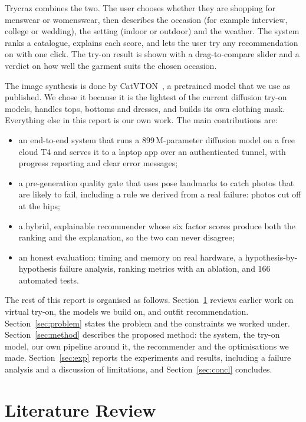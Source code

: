 \documentclass{article}
\begin{document}
Trycraz combines the two. The user chooses whether they are shopping for menswear or womenswear, then
describes the occasion (for example interview, college or wedding), the setting (indoor or outdoor) and
the weather. The system ranks a catalogue, explains each score, and lets the user try any
recommendation on with one click. The try-on result is shown with a drag-to-compare slider and a
verdict on how well the garment suits the chosen occasion.

The image synthesis is done by CatVTON~\cite{catvton}, a pretrained model that we use as published.
We chose it because it is the lightest of the current diffusion try-on models, handles tops, bottoms
and dresses, and builds its own clothing mask. Everything else in this report is our own work. The
main contributions are:
\begin{itemize}
\item an end-to-end system that runs a 899\,M-parameter diffusion model on a free cloud T4 and serves
it to a laptop app over an authenticated tunnel, with progress reporting and clear error messages;
\item a pre-generation quality gate that uses pose landmarks to catch photos that are likely to fail,
including a rule we derived from a real failure: photos cut off at the hips;
\item a hybrid, explainable recommender whose six factor scores produce both the ranking and the
explanation, so the two can never disagree;
\item an honest evaluation: timing and memory on real hardware, a hypothesis-by-hypothesis failure
analysis, ranking metrics with an ablation, and 166 automated tests.
\end{itemize}


The rest of this report is organised as follows. Section~\ref{sec:lit} reviews earlier work on
virtual try-on, the models we build on, and outfit recommendation. Section~\ref{sec:problem} states
the problem and the constraints we worked under. Section~\ref{sec:method} describes the proposed
method: the system, the try-on model, our own pipeline around it, the recommender and the
optimisations we made. Section~\ref{sec:exp} reports the experiments and results, including a failure
analysis and a discussion of limitations, and Section~\ref{sec:concl} concludes.

\section{Literature Review}
\label{sec:lit}
\end{document}
